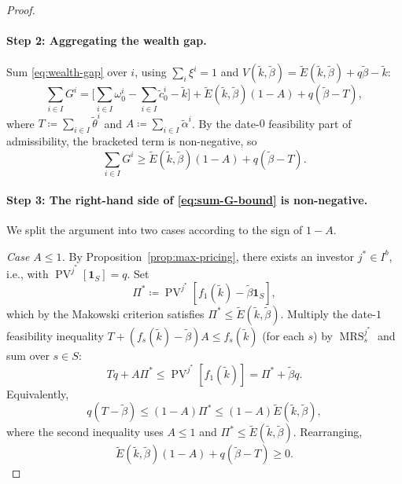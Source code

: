 \documentclass[11pt,a4paper,oneside]{book}
\def\1{\mathbf{1}}
\def\leq{\leqslant}
\def\geq{\geqslant}
\DeclareMathOperator{\MRS}{MRS}
\DeclareMathOperator{\PV}{PV}
\theoremstyle{plain}
\theoremstyle{definition}
\theoremstyle{remark}
\numberwithin{equation}{chapter}
\begin{document}
\begin{proof}
\paragraph{Step 2: Aggregating the wealth gap.}
Sum \eqref{eq:wealth-gap} over $i$, using $\sum_i \xi^i = 1$ and $V(\widetilde{k}, \widetilde{\beta}) = \widetilde{E}(\widetilde{k}, \widetilde{\beta}) + q\widetilde{\beta} - \widetilde{k}$:
\begin{equation*}
  \sum_{i \in I} G^i
  = \biggl[ \sum_{i \in I} \omega^i_0 - \sum_{i \in I} \widetilde{c}^i_0 - \widetilde{k} \biggr]
  + \widetilde{E}(\widetilde{k}, \widetilde{\beta}) (1 - A)
  + q (\widetilde{\beta} - T),
\end{equation*}
where $T \coloneqq \sum_{i \in I} \widetilde{\theta}^i$ and $A \coloneqq \sum_{i \in I} \widetilde{\alpha}^i$.
By the date-$0$ feasibility part of admissibility, the bracketed term is non-negative, so
\begin{equation}\label{eq:sum-G-bound}
  \sum_{i \in I} G^i \geq \widetilde{E}(\widetilde{k}, \widetilde{\beta}) (1 - A) + q(\widetilde{\beta} - T).
\end{equation}

\paragraph{Step 3: The right-hand side of \eqref{eq:sum-G-bound} is non-negative.}
We split the argument into two cases according to the sign of $1 - A$.

\textit{Case $A \leq 1$.}
By Proposition~\ref{prop:max-pricing}, there exists an investor $j^\ast \in I^b$, i.e., with $\PV^{j^\ast}[\1_S] = q$.
Set
\begin{equation*}
  \Pi^\ast \coloneqq \PV^{j^\ast}[f_1(\widetilde{k}) - \widetilde{\beta} \1_S],
\end{equation*}
which by the Makowski criterion satisfies $\Pi^\ast \leq \widetilde{E}(\widetilde{k}, \widetilde{\beta})$.
Multiply the date-$1$ feasibility inequality $T + (f_s(\widetilde{k}) - \widetilde{\beta}) A \leq f_s(\widetilde{k})$ (for each $s$) by $\MRS^{j^\ast}_s$ and sum over $s \in S$:
\begin{equation*}
  T q + A \Pi^\ast \leq \PV^{j^\ast}[f_1(\widetilde{k})] = \Pi^\ast + \widetilde{\beta} q.
\end{equation*}
Equivalently,
\begin{equation*}
  q (T - \widetilde{\beta}) \leq (1 - A) \Pi^\ast \leq (1 - A) \widetilde{E}(\widetilde{k}, \widetilde{\beta}),
\end{equation*}
where the second inequality uses $A \leq 1$ and $\Pi^\ast \leq \widetilde{E}(\widetilde{k}, \widetilde{\beta})$.
Rearranging,
\begin{equation}\label{eq:case-A-le-1}
  \widetilde{E}(\widetilde{k}, \widetilde{\beta})(1 - A) + q(\widetilde{\beta} - T) \geq 0.
\end{equation}


\end{proof}
\end{document}
